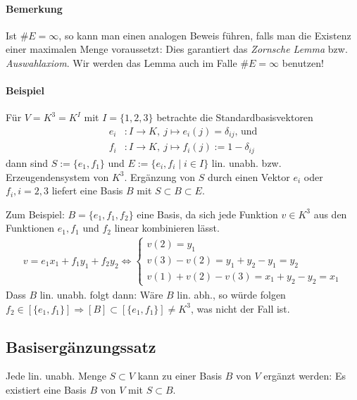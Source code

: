 \paragraph{Bemerkung}
    Ist $\#E = \infty$, so kann man einen analogen Beweis führen, falls man die Existenz einer maximalen Menge voraussetzt: Dies garantiert das \emph{Zornsche Lemma} bzw. \emph{Auswahlaxiom}.
    Wir werden das Lemma auch im Falle $\#E = \infty$ benutzen!

\paragraph{Beispiel}
    Für $V=K^3=K^I$ mit $I=\{1,2,3\}$ betrachte die Standardbasisvektoren 
    \begin{align*}
        e_i &:I\to K,\ j\mapsto e_i(j) = \delta_{ij}\text{, und}\\
        f_i &: I\to K,\ j\mapsto f_i(j):= 1-\delta_{ij}
    \end{align*}
    dann sind $S:= \{e_1,f_1\}$ und $E:= \{e_i,f_i\mid i\in I\}$ lin. unabh. bzw. Erzeugendensystem von $K^3$. Ergänzung von $S$ durch einen Vektor $e_i$ oder $f_i, i = 2,3$ liefert eine Basis $B$ mit $S\subset B\subset E$.
    
    Zum Beispiel: $B=\{e_1,f_1,f_2\}$ eine Basis, da sich jede Funktion $v\in K^3$ aus den Funktionen $e_1,f_1$ und $f_2$ linear kombinieren lässt.
    \begin{gather*}
        v=e_1x_1+f_1y_1 + f_2y_2\Leftrightarrow \left\{
            \begin{array}{l}
                v(2)=y_1\\
                v(3) - v(2) = y_1 + y_2 - y_1 = y_2\\
                v(1) + v(2) - v(3) = x_1 + y_2 - y_2 = x_1
            \end{array}
    	\right.
    \end{gather*}
    Dass $B$ lin. unabh. folgt dann: Wäre $B$ lin. abh., so würde folgen $f_2\in [\{e_1,f_1\}]\Rightarrow [B] \subset [\{e_1,f_1\}] \neq K^3$, was nicht der Fall ist.

\subsection{Basisergänzungssatz}
    \begin{Satz}[Basisergänzungssatz]
    	Jede lin. unabh. Menge $S\subset V$ kann zu einer Basis $B$ von $V$ ergänzt werden: Es existiert eine Basis $B$ von $V$ mit $S\subset B$.
    \end{Satz}

